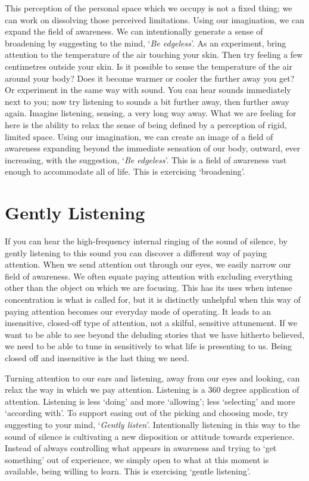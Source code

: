 This perception of the personal space which we occupy is not a fixed
thing; we can work on dissolving those perceived limitations. Using our
imagination, we can expand the field of awareness. We can intentionally
generate a sense of broadening by suggesting to the mind, ‘\emph{Be
edgeless}’. As an experiment, bring attention to the temperature of the
air touching your skin. Then try feeling a few centimetres outside your
skin. Is it possible to sense the temperature of the air around your
body? Does it become warmer or cooler the further away you get? Or
experiment in the same way with sound. You can hear sounds immediately
next to you; now try listening to sounds a bit further away, then
further away again. Imagine listening, sensing, a very long way away.
What we are feeling for here is the ability to relax the sense of being
defined by a perception of rigid, limited space. Using our imagination,
we can create an image of a field of awareness expanding beyond the
immediate sensation of our body, outward, ever increasing, with the
suggestion, ‘\emph{Be edgeless}’. This is a field of awareness vast enough to
accommodate all of life. This is exercising ‘broadening’.

\section{Gently Listening}

If you can hear the high-frequency internal ringing of the sound of
silence, by gently listening to this sound you can discover a different
way of paying attention. When we send attention out through our eyes, we
easily narrow our field of awareness. We often equate paying attention
with excluding everything other than the object on which we are
focusing. This has its uses when intense concentration is what is called
for, but it is distinctly unhelpful when this way of paying attention
becomes our everyday mode of operating. It leads to an insensitive,
closed-off type of attention, not a skilful, sensitive attunement. If we
want to be able to see beyond the deluding stories that we have hitherto
believed, we need to be able to tune in sensitively to what life is
presenting to us. Being closed off and insensitive is the last thing we
need.

Turning attention to our ears and listening, away from our eyes and
looking, can relax the way in which we pay attention. Listening is a 360
degree application of attention. Listening is less ‘doing’ and more
‘allowing’; less ‘selecting’ and more ‘according with’. To support
easing out of the picking and choosing mode, try suggesting to your
mind, ‘\emph{Gently listen}’. Intentionally listening in this way to the
sound of silence is cultivating a new disposition or attitude towards
experience. Instead of always controlling what appears in awareness and
trying to ‘get something’ out of experience, we simply open to what at
this moment is available, being willing to learn. This is exercising
‘gentle listening’.

